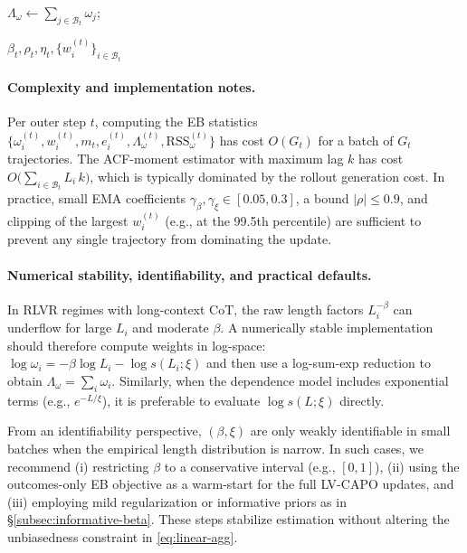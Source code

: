\begin{algorithm}
\(\Lambda_\omega \gets \sum_{j\in\mathcal B_t} \omega_j\);\;

\Return \(\beta_t,\rho_t,\eta_t,\{w_i^{(t)}\}_{i\in\mathcal B_t}\)\;
\end{algorithm}

\paragraph{Complexity and implementation notes.}
Per outer step \(t\), computing the EB statistics \(\{\omega_i^{(t)},w_i^{(t)},m_t,e_i^{(t)},\Lambda_\omega^{(t)},\mathrm{RSS}_\omega^{(t)}\}\) has cost \(O(G_t)\) for a batch of \(G_t\) trajectories.
The ACF-moment estimator with maximum lag \(k\) has cost \(O\big(\sum_{i\in\mathcal B_t} L_i\,k\big)\), which is typically dominated by the rollout generation cost.
In practice, small EMA coefficients \(\gamma_\beta,\gamma_\xi\in[0.05,0.3]\), a bound \(|\rho|\le 0.9\), and clipping of the largest \(w_i^{(t)}\) (e.g., at the 99.5th percentile) are sufficient to prevent any single trajectory from dominating the update.

\paragraph{Numerical stability, identifiability, and practical defaults.}
In RLVR regimes with long-context CoT, the raw length factors $L_i^{-\beta}$ can underflow for large $L_i$ and moderate $\beta$.
A numerically stable implementation should therefore compute weights in log-space:
$\log \omega_i = -\beta \log L_i - \log s(L_i;\xi)$ and then use a log-sum-exp reduction to obtain $\Lambda_\omega=\sum_i \omega_i$.
Similarly, when the dependence model includes exponential terms (e.g., $e^{-L/\xi}$), it is preferable to evaluate $\log s(L;\xi)$ directly.

From an identifiability perspective, $(\beta,\xi)$ are only weakly identifiable in small batches when the empirical length distribution is narrow.
In such cases, we recommend (i) restricting $\beta$ to a conservative interval (e.g., $[0,1]$), (ii) using the outcomes-only EB objective as a warm-start for the full LV-CAPO updates, and (iii) employing mild regularization or informative priors as in \S\ref{subsec:informative-beta}.
These steps stabilize estimation without altering the unbiasedness constraint in \eqref{eq:linear-agg}.


